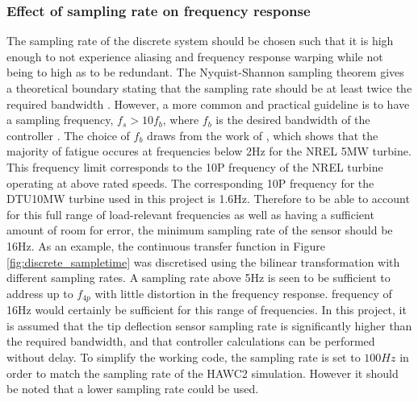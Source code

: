 

\subsubsection{Effect of sampling rate on frequency response}
The sampling rate of the discrete system should be chosen such that it is high enough to not experience aliasing and frequency response warping while not being to high as to be redundant. The Nyquist-Shannon sampling theorem gives a theoretical boundary stating that the sampling rate should be at least twice the required bandwidth \cite{smith1997scientist}. However, a more common and practical guideline is to have a sampling frequency, $f_s>10f_b$, where $f_b$ is the desired bandwidth of the controller \cite{hendricks2008linear}. The choice of $f_b$ draws from the work of \citet{bergami2014analysis}, which shows that the majority of fatigue occures at frequencies below 2Hz for the NREL 5MW turbine. This frequency limit corresponds to the 10P frequency of the NREL turbine operating at above rated speeds. The corresponding 10P frequency for the DTU10MW turbine used in this project is 1.6Hz. Therefore to be able to account for this full range of load-relevant frequencies as well as having a sufficient amount of room for error, the minimum sampling rate of the sensor should be 16Hz.
As an example, the continuous transfer function in Figure \ref{fig:discrete_sampletime} was discretised using the bilinear transformation with different sampling rates. A sampling rate above 5Hz is seen to be sufficient to address up to $f_{4p}$ with little distortion in the frequency response.  frequency of 16Hz would certainly be sufficient for this range of frequencies. In this project, it is assumed that the tip deflection sensor sampling rate is significantly higher than the required bandwidth, and that controller calculations can be performed without delay. To simplify the working code, the sampling rate is set to $100Hz$ in order to match the sampling rate of the HAWC2 simulation. However it should be noted that a lower sampling rate could be used. 


